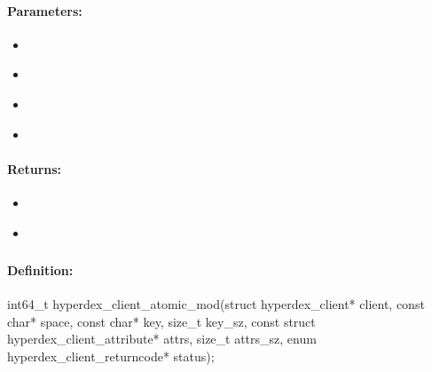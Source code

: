 \paragraph{Parameters:}
\begin{itemize}[noitemsep]
\item {}\\

\item {}\\

\item {}\\

\item {}\\

\end{itemize}

\paragraph{Returns:}
\begin{itemize}[noitemsep]
\item {}\\

\item {}\\

\end{itemize}

\pagebreak
\subsubsection{}
\label{api:c:atomic_mod}


\paragraph{Definition:}
\begin{ccode}
int64_t hyperdex_client_atomic_mod(struct hyperdex_client* client,
        const char* space,
        const char* key, size_t key_sz,
        const struct hyperdex_client_attribute* attrs, size_t attrs_sz,
        enum hyperdex_client_returncode* status);
\end{ccode}

